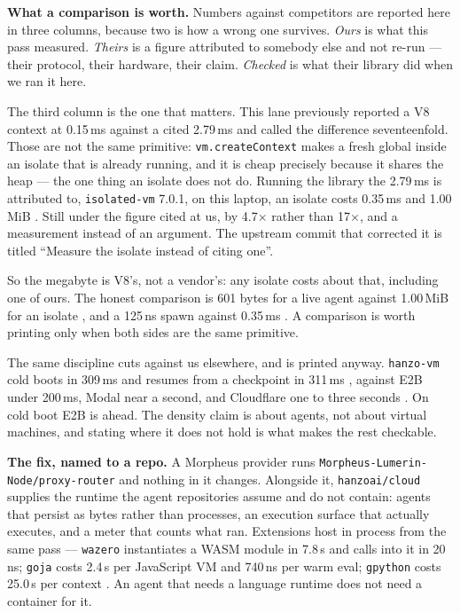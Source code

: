 \documentclass[11pt,a4paper]{article}
\newcommand{\code}[1]{\texttt{\small #1}}
\newcommand{\prov}[1]{{\color{muted}\scriptsize\sffamily[#1]}}
\begin{document}
\vspace{0.35ex}
\noindent\textbf{What a comparison is worth.}
Numbers against competitors are reported here in three columns, because two is how a wrong one
survives. \emph{Ours} is what this pass measured. \emph{Theirs} is a figure attributed to
somebody else and not re-run --- their protocol, their hardware, their claim. \emph{Checked} is
what their library did when we ran it here.

The third column is the one that matters. This lane previously reported a V8 context at
0.15\,ms against a cited 2.79\,ms and called the difference seventeenfold. Those are not the
same primitive: \code{vm.createContext} makes a fresh global inside an isolate that is already
running, and it is cheap precisely because it shares the heap --- the one thing an isolate does
not do. Running the library the 2.79\,ms is attributed to, \code{isolated-vm} 7.0.1, on this
laptop, an isolate costs 0.35\,ms and 1.00\,MiB \prov{checked}. Still under the figure cited at
us, by 4.7$\times$ rather than 17$\times$, and a measurement instead of an argument. The
upstream commit that corrected it is titled ``Measure the isolate instead of citing one''.

So the megabyte is V8's, not a vendor's: any isolate costs about that, including one of ours.
The honest comparison is 601 bytes for a live agent against 1.00\,MiB for an isolate
\prov{checked}, and a 125\,ns spawn against 0.35\,ms \prov{checked}. A comparison is worth
printing only when both sides are the same primitive.

The same discipline cuts against us elsewhere, and is printed anyway. \code{hanzo-vm} cold
boots in 309\,ms and resumes from a checkpoint in 311\,ms \prov{measured}, against E2B under
200\,ms, Modal near a second, and Cloudflare one to three seconds \prov{attributed}. On cold
boot E2B is ahead. The density claim is about agents, not about virtual machines, and stating
where it does not hold is what makes the rest checkable.

\vspace{0.35ex}
\noindent\textbf{The fix, named to a repo.}
A Morpheus provider runs \code{Morpheus-Lumerin-Node/proxy-router} and nothing in it changes.
Alongside it, \code{hanzoai/cloud} supplies the runtime the agent repositories assume and do
not contain: agents that persist as bytes rather than processes, an execution surface that
actually executes, and a meter that counts what ran. Extensions host in process from the same
pass --- \code{wazero} instantiates a WASM module in 7.8\,\textmu s and calls into it in
20\,ns; \code{goja} costs 2.4\,\textmu s per JavaScript VM and 740\,ns per warm eval;
\code{gpython} costs 25.0\,\textmu s per context \prov{measured}. An agent that needs a
language runtime does not need a container for it.
\end{document}

